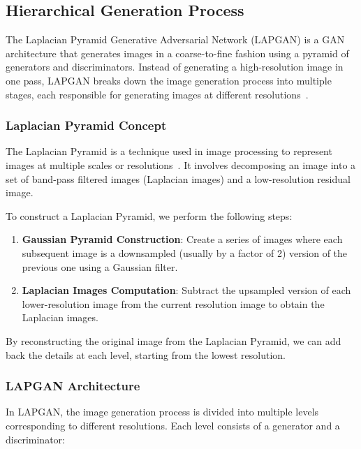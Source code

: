 \subsection{Hierarchical Generation Process}

The Laplacian Pyramid Generative Adversarial Network (LAPGAN) is a GAN architecture that generates images in a coarse-to-fine fashion using a pyramid of generators and discriminators. Instead of generating a high-resolution image in one pass, LAPGAN breaks down the image generation process into multiple stages, each responsible for generating images at different resolutions~\cite{jin2020hierarchical}.

\subsubsection{Laplacian Pyramid Concept}

The Laplacian Pyramid is a technique used in image processing to represent images at multiple scales or resolutions~\cite{zhang2018photographic}. It involves decomposing an image into a set of band-pass filtered images (Laplacian images) and a low-resolution residual image.

To construct a Laplacian Pyramid, we perform the following steps:

\begin{enumerate}
    \item \textbf{Gaussian Pyramid Construction}: Create a series of images where each subsequent image is a downsampled (usually by a factor of 2) version of the previous one using a Gaussian filter.
    \item \textbf{Laplacian Images Computation}: Subtract the upsampled version of each lower-resolution image from the current resolution image to obtain the Laplacian images.
\end{enumerate}

By reconstructing the original image from the Laplacian Pyramid, we can add back the details at each level, starting from the lowest resolution.

\subsubsection{LAPGAN Architecture}

In LAPGAN, the image generation process is divided into multiple levels corresponding to different resolutions. Each level consists of a generator and a discriminator:

